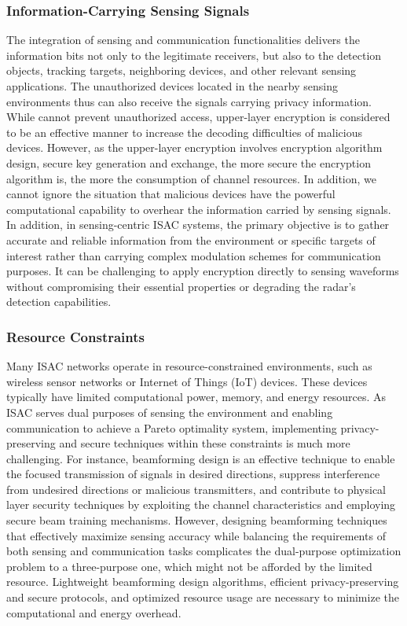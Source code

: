 \documentclass[10pt,journal,twocolumn,twoside]{IEEEtran} %
\begin{document}
\subsubsection{Information-Carrying Sensing Signals}
The integration of sensing and communication functionalities delivers the information bits not only to the legitimate receivers, but also to the detection objects, tracking targets, neighboring devices, and other relevant sensing applications. The unauthorized devices located in the nearby sensing environments thus can also receive the signals carrying privacy information. While cannot prevent unauthorized access, upper-layer encryption is considered to be an effective manner to increase the decoding difficulties of malicious devices. However, as the upper-layer encryption involves encryption algorithm design, secure key generation and exchange, the more secure the encryption algorithm is, the more the consumption of channel resources. In addition, we cannot ignore the situation that malicious devices have the powerful computational capability to overhear the information carried by sensing signals. In addition, in sensing-centric ISAC systems, the primary objective is to gather accurate and reliable information from the environment or specific targets of interest rather than carrying complex modulation schemes for communication purposes. It can be challenging to apply encryption directly to sensing waveforms without compromising their essential properties or degrading the radar's detection capabilities.

\subsubsection{Resource Constraints}
Many ISAC networks operate in resource-constrained environments, such as wireless sensor networks or Internet of Things (IoT) devices. These devices typically have limited computational power, memory, and energy resources. As ISAC serves dual purposes of sensing the environment and enabling communication to achieve a Pareto optimality system, implementing privacy-preserving and secure techniques within these constraints is much more challenging. For instance, beamforming design is an effective technique to enable the focused transmission of signals in desired directions, suppress interference from undesired directions or malicious transmitters, and contribute to physical layer security techniques by exploiting the channel characteristics and employing secure beam training mechanisms. However, designing beamforming techniques that effectively maximize sensing accuracy while balancing the requirements of both sensing and communication tasks complicates the dual-purpose optimization problem to a three-purpose one, which might not be afforded by the limited resource. Lightweight beamforming design algorithms, efficient privacy-preserving and secure protocols, and optimized resource usage are necessary to minimize the computational and energy overhead. 
\end{document}
